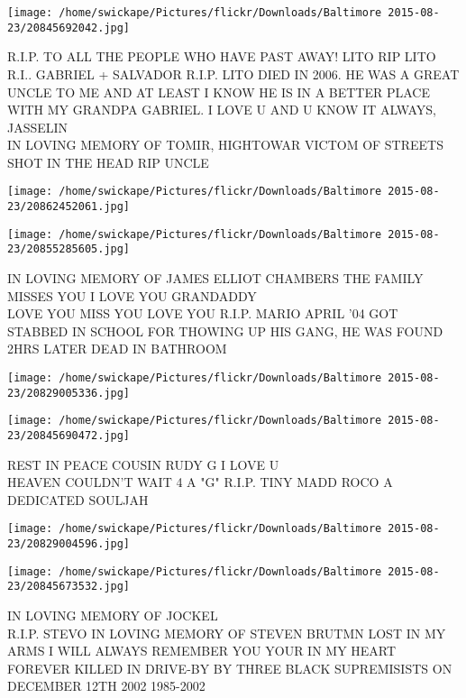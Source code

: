 \documentclass[10pt,letterpaper]{article}
\begin{document}
\vspace{0.25in}
\texttt{[image: /home/swickape/Pictures/flickr/Downloads/Baltimore 2015-08-23/20845692042.jpg]}

R.I.P. TO ALL THE PEOPLE WHO HAVE PAST AWAY!  LITO RIP LITO R.I.. GABRIEL + SALVADOR R.I.P. LITO DIED IN 2006.  HE WAS A GREAT UNCLE TO ME AND AT LEAST I KNOW HE IS IN A BETTER PLACE WITH MY GRANDPA GABRIEL.  I LOVE U AND U KNOW IT ALWAYS, JASSELIN\\
IN LOVING MEMORY OF TOMIR, HIGHTOWAR VICTOM OF STREETS SHOT IN THE HEAD RIP UNCLE\\
\pagebreak

\texttt{[image: /home/swickape/Pictures/flickr/Downloads/Baltimore 2015-08-23/20862452061.jpg]}

\vspace{0.25in}
\texttt{[image: /home/swickape/Pictures/flickr/Downloads/Baltimore 2015-08-23/20855285605.jpg]}

IN LOVING MEMORY OF JAMES ELLIOT CHAMBERS THE FAMILY MISSES YOU I LOVE YOU GRANDADDY\\
LOVE YOU MISS YOU LOVE YOU R.I.P. MARIO APRIL '04 GOT STABBED IN SCHOOL FOR THOWING UP HIS GANG, HE WAS FOUND 2HRS LATER DEAD IN BATHROOM\\
\pagebreak

\texttt{[image: /home/swickape/Pictures/flickr/Downloads/Baltimore 2015-08-23/20829005336.jpg]}

\vspace{0.25in}
\texttt{[image: /home/swickape/Pictures/flickr/Downloads/Baltimore 2015-08-23/20845690472.jpg]}

REST IN PEACE COUSIN RUDY G I LOVE U\\
HEAVEN COULDN'T WAIT 4 A "G" R.I.P. TINY MADD ROCO A DEDICATED SOULJAH\\
\pagebreak

\texttt{[image: /home/swickape/Pictures/flickr/Downloads/Baltimore 2015-08-23/20829004596.jpg]}

\vspace{0.25in}
\texttt{[image: /home/swickape/Pictures/flickr/Downloads/Baltimore 2015-08-23/20845673532.jpg]}

IN LOVING MEMORY OF JOCKEL\\
R.I.P. STEVO IN LOVING MEMORY OF STEVEN BRUTMN LOST IN MY ARMS I WILL ALWAYS REMEMBER YOU YOUR IN MY HEART FOREVER KILLED IN DRIVE{-}BY BY THREE BLACK SUPREMISISTS ON DECEMBER 12TH 2002 1985{-}2002\\
\pagebreak
\end{document}
